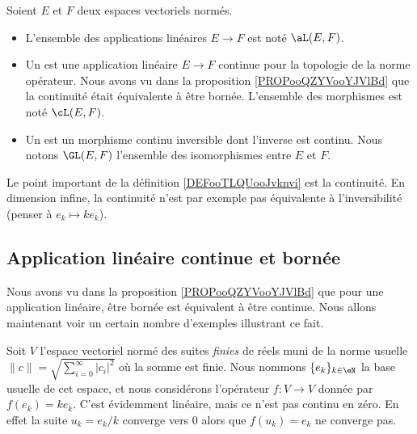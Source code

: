 \begin{definition}      \label{DEFooTLQUooJvknvi}
    Soient \( E\) et \( F\) deux espaces vectoriels normés.
    \begin{itemize}
        \item
            L'ensemble des applications linéaires \( E\to F\) est noté \( \aL(E,F)\).
        \item Un  est une application linéaire \( E\to F\) continue pour la topologie de la norme opérateur. Nous avons vu dans la proposition \ref{PROPooQZYVooYJVlBd} que la continuité était équivalente à être bornée. L'ensemble des morphismes est noté \( \cL(E,F)\). 
        \item
            Un  est un morphisme continu inversible dont l'inverse est continu. Nous notons \( \GL(E,F)\) l'ensemble des isomorphismes entre \( E\) et \( F\).
    \end{itemize}
\end{definition}

Le point important de la définition \ref{DEFooTLQUooJvknvi} est la continuité. En dimension infine, la continuité n'est par exemple pas équivalente à l'inversibilité (penser à \( e_k\mapsto ke_k\)).

\subsection{Application linéaire continue et bornée}

Nous avons vu dans la proposition \ref{PROPooQZYVooYJVlBd} que pour une application linéaire, être bornée est équivalent à être continue. Nous allons maintenant voir un certain nombre d'exemples illustrant ce fait.

\begin{example}  \label{ExHKsIelG}
    Soit \( V\) l'espace vectoriel normé des suites \emph{finies} de réels muni de la norme usuelle $\| c \|=\sqrt{\sum_{i=0}^{\infty}| c_i |^2}$ où la somme est finie. Nous nommons \( \{ e_k \}_{k\in \eN}\) la base usuelle de cet espace, et nous considérons l'opérateur \( f\colon V\to V\) donnée par \( f(e_k)=ke_k\). C'est évidemment linéaire, mais ce n'est pas continu en zéro. En effet la suite \( u_k=e_k/k\) converge vers \( 0\) alors que \( f(u_k)=e_k\) ne converge pas.
\end{example}

